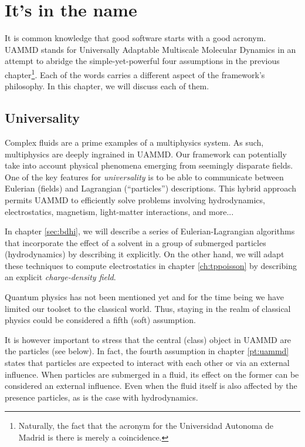 \documentclass[ twoside,openright,titlepage,numbers=noenddot,%
headinclude,footinclude,cleardoublepage=empty,abstract=on,
BCOR=5mm,paper=b5,fontsize=11pt, dvipsnames
]{scrreprt}
\newcommand{\uammd}{\gls{UAMMD}\xspace}
\begin{document}
\chapter{It's in the name}\label{ch:design}

It is common knowledge that good software starts with a good acronym. \uammd stands for Universally Adaptable Multiscale Molecular Dynamics in an attempt to abridge the simple-yet-powerful four assumptions in the previous chapter\footnote{Naturally, the fact that the acronym for the Universidad Autonoma de Madrid is there is merely a coincidence.}. Each of the words carries a different aspect of the framework's philosophy. In this chapter, we will discuss each of them.
\section{\uppercase{\textbf{U}}niversality}

Complex fluids are a prime examples of a multiphysics system. As such, multiphysics are deeply ingrained in \uammd. Our framework can potentially take into account physical phenomena emerging from seemingly disparate fields.
One of the key features for \emph{universality} is to be able to communicate between Eulerian (fields) and Lagrangian (``particles'') descriptions. This hybrid approach permits \uammd to efficiently solve problems involving hydrodynamics, electrostatics, magnetism, light-matter interactions, and more... 
  
In chapter \ref{sec:bdhi}, we will describe a series of Eulerian-Lagrangian algorithms that incorporate the effect of a solvent in a group of submerged particles (hydrodynamics) by describing it explicitly. On the other hand, we will adapt these techniques to compute electrostatics in chapter \ref{ch:tppoisson} by describing an explicit \emph{charge-density field}.

Quantum physics has not been mentioned yet and for the time being we have limited our toolset to the classical world. Thus, staying in the realm of classical physics could be considered a fifth (soft) assumption.

It is however important to stress that the central (class) object in \uammd are the particles (see below). In fact, the fourth assumption in chapter \ref{pt:uammd} states that particles are expected to interact with each other or via an external influence. When particles are submerged in a fluid, its effect on the former can be considered an external influence. Even when the fluid itself is also affected by the presence particles, as is the case with hydrodynamics.
\end{document}
